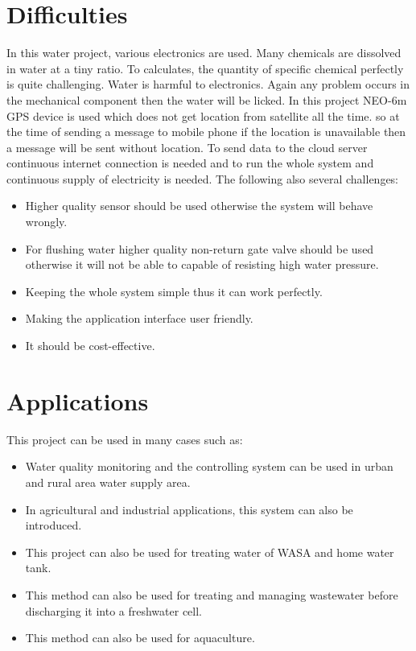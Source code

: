 \section{Difficulties}
In this water project, various electronics are used. Many chemicals are dissolved in water at a tiny ratio. To calculates, the quantity of specific chemical perfectly is quite challenging. Water is harmful to electronics. Again any problem occurs in the mechanical component then the water will be licked. In this project NEO-6m GPS device is used which does not get location from satellite all the time. so at the time of sending a message to mobile phone if the location is unavailable then a message will be sent without location.  To send data to the cloud server continuous internet connection is needed and to run the whole system and continuous supply of electricity is needed. 
The following also several challenges:
\begin{itemize}
    
\item Higher quality sensor should be used otherwise the system will behave wrongly.
\item For flushing water higher quality non-return gate valve should be used otherwise it will not be able to capable of resisting high water pressure.
\item Keeping the whole system simple thus it can work perfectly.
\item Making the application interface user friendly.
\item It should be cost-effective.
\end{itemize}
\section{Applications}
This project can be used in many cases such as:
\begin{itemize}
\item Water quality monitoring and the controlling system can be used in urban and rural area water supply area. 
\item In agricultural and industrial applications, this system can also be introduced.
\item This project can also be used for treating water of WASA and home water tank.
\item This method can also be used for treating and managing wastewater before discharging it into a freshwater cell.
\item This method can also be used for aquaculture.

\end{itemize}

